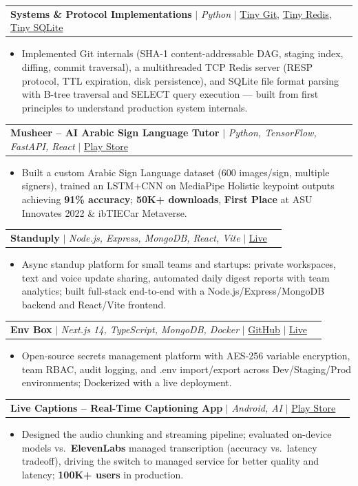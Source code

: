 \documentclass[letterpaper,11pt]{article}
\makeatletter
\newcommand{\resumeItem}[1]{
  \item\small{{#1 \vspace{-2pt}}}
}
\newcommand{\resumeProjectHeading}[2]{
    \item
    \begin{tabular*}{0.97\textwidth}{l@{\extracolsep{\fill}}r}
      \small#1 & #2 \\
    \end{tabular*}\vspace{-7pt}
}
\newcommand{\resumeItemListStart}{\begin{itemize}}
\newcommand{\resumeItemListEnd}{\end{itemize}\vspace{-5pt}}
\makeatother
\begin{document}
    \resumeProjectHeading
        {\textbf{Systems \& Protocol Implementations} $|$ \emph{Python} $|$ \href{https://github.com/a7medayman6/Tiny-Git}{Tiny Git}, \href{https://github.com/a7medayman6/Tiny-Redis}{Tiny Redis}, \href{https://github.com/a7medayman6/Tiny-SQLite}{Tiny SQLite}}{}
        \resumeItemListStart
          \resumeItem{Implemented Git internals (SHA-1 content-addressable DAG, staging index, diffing, commit traversal), a multithreaded TCP Redis server (RESP protocol, TTL expiration, disk persistence), and SQLite file format parsing with B-tree traversal and SELECT query execution --- built from first principles to understand production system internals.}
        \resumeItemListEnd

    \resumeProjectHeading
        {\textbf{Musheer -- AI Arabic Sign Language Tutor} $|$ \emph{Python, TensorFlow, FastAPI, React} $|$ \href{https://play.google.com/store/apps/details?id=com.musheer.musheer}{Play Store}}{}
        \resumeItemListStart
          \resumeItem{Built a custom Arabic Sign Language dataset (600 images/sign, multiple signers), trained an LSTM+CNN on MediaPipe Holistic keypoint outputs achieving \textbf{91\% accuracy}; \textbf{50K+ downloads}, \textbf{First Place} at ASU Innovates 2022 \& ibTIECar Metaverse.}
        \resumeItemListEnd

    \resumeProjectHeading
        {\textbf{Standuply} $|$ \emph{Node.js, Express, MongoDB, React, Vite} $|$ \href{https://standuply.vercel.app/}{Live}}{}
        \resumeItemListStart
          \resumeItem{Async standup platform for small teams and startups: private workspaces, text and voice update sharing, automated daily digest reports with team analytics; built full-stack end-to-end with a Node.js/Express/MongoDB backend and React/Vite frontend.}
        \resumeItemListEnd

    \resumeProjectHeading
        {\textbf{Env Box} $|$ \emph{Next.js 14, TypeScript, MongoDB, Docker} $|$ \href{https://github.com/a7medayman6/env-box}{GitHub} $|$ \href{https://env-box.vercel.app}{Live}}{}
        \resumeItemListStart
          \resumeItem{Open-source secrets management platform with AES-256 variable encryption, team RBAC, audit logging, and .env import/export across Dev/Staging/Prod environments; Dockerized with a live deployment.}
        \resumeItemListEnd

    \resumeProjectHeading
        {\textbf{Live Captions -- Real-Time Captioning App} $|$ \emph{Android, AI} $|$ \href{https://play.google.com/store/apps/details?id=com.tools.livecaptions}{Play Store}}{}
        \resumeItemListStart
          \resumeItem{Designed the audio chunking and streaming pipeline; evaluated on-device models vs.\ \textbf{ElevenLabs} managed transcription (accuracy vs.\ latency tradeoff), driving the switch to managed service for better quality and latency; \textbf{100K+ users} in production.}
        \resumeItemListEnd
\end{document}
